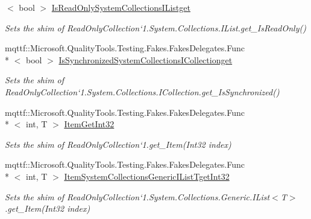 \begin{DoxyCompactItemize}
$<$ bool $>$ \hyperlink{class_system_1_1_collections_1_1_object_model_1_1_fakes_1_1_shim_read_only_collection_3_01_t_01_4_a0fcdab69be8b44f52689cef769eb3be8}{Is\-Read\-Only\-System\-Collections\-I\-Listget}
\begin{DoxyCompactList}\small\item\em Sets the shim of Read\-Only\-Collection`1.System.\-Collections.\-I\-List.\-get\-\_\-\-Is\-Read\-Only()\end{DoxyCompactList}\item 
mqttf\-::\-Microsoft.\-Quality\-Tools.\-Testing.\-Fakes.\-Fakes\-Delegates.\-Func\\*
$<$ bool $>$ \hyperlink{class_system_1_1_collections_1_1_object_model_1_1_fakes_1_1_shim_read_only_collection_3_01_t_01_4_a91174d7f0b707df285ea4982a1c6e516}{Is\-Synchronized\-System\-Collections\-I\-Collectionget}
\begin{DoxyCompactList}\small\item\em Sets the shim of Read\-Only\-Collection`1.System.\-Collections.\-I\-Collection.\-get\-\_\-\-Is\-Synchronized()\end{DoxyCompactList}\item 
mqttf\-::\-Microsoft.\-Quality\-Tools.\-Testing.\-Fakes.\-Fakes\-Delegates.\-Func\\*
$<$ int, T $>$ \hyperlink{class_system_1_1_collections_1_1_object_model_1_1_fakes_1_1_shim_read_only_collection_3_01_t_01_4_a4e4c56e70edcb02ae73ab0c40637fb6d}{Item\-Get\-Int32}
\begin{DoxyCompactList}\small\item\em Sets the shim of Read\-Only\-Collection`1.get\-\_\-\-Item(\-Int32 index)\end{DoxyCompactList}\item 
mqttf\-::\-Microsoft.\-Quality\-Tools.\-Testing.\-Fakes.\-Fakes\-Delegates.\-Func\\*
$<$ int, T $>$ \hyperlink{class_system_1_1_collections_1_1_object_model_1_1_fakes_1_1_shim_read_only_collection_3_01_t_01_4_a68f870bdbe84769a6cd28f071bc72b6a}{Item\-System\-Collections\-Generic\-I\-List\-Tget\-Int32}
\begin{DoxyCompactList}\small\item\em Sets the shim of Read\-Only\-Collection`1.System.\-Collections.\-Generic.\-I\-List$<$T$>$.get\-\_\-\-Item(\-Int32 index)\end{DoxyCompactList}\item 

\end{DoxyCompactItemize}
